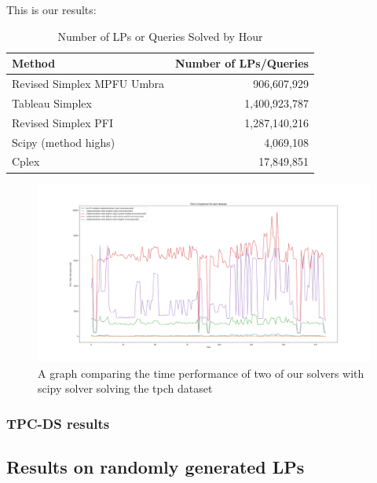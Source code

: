 This is our results:
\begin{table}[ht]
    \centering
    \caption{Number of LPs or Queries Solved by Hour}
    \begin{tabular}{l|r}
        \toprule
        Method                     & Number of LPs/Queries \\
        \midrule
        Revised Simplex MPFU Umbra & 906,607,929           \\
        Tableau Simplex            & 1,400,923,787           \\
        Revised Simplex PFI        & 1,287,140,216          \\
        Scipy (method highs)       & 4,069,108             \\
        Cplex                      &  17,849,851            \\
        \bottomrule
    \end{tabular}
\end{table}


\begin{figure}[p] %
    \begin{adjustbox}{width=\paperwidth,center}
        \includegraphics[width=\paperwidth]{figures/all_scify_mpfi_pfi.png}
    \end{adjustbox}
    \caption{A graph comparing the time performance of two of
        our solvers with scipy solver solving the tpch dataset}
    \label{fig:all_time_tpch}
\end{figure}

\subsubsection{TPC-DS results}

\subsection{Results on randomly generated LPs}

